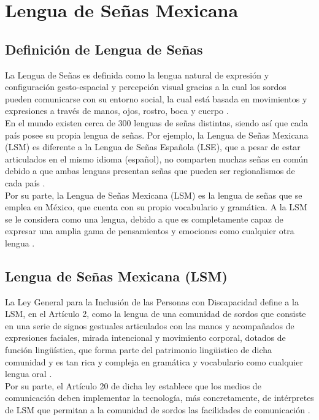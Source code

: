 \newpage
\section{Lengua de Señas Mexicana}
\subsection{Definición de Lengua de Señas}
La Lengua de Señas es definida como la lengua natural de expresión y configuración gesto-espacial y percepción visual gracias a la cual los sordos pueden comunicarse con su entorno social, la cual está basada en movimientos y expresiones a través de manos, ojos, rostro, boca y cuerpo \cite{ref33}.\\

En el mundo existen cerca de 300 lenguas de señas distintas, siendo así que cada país posee su propia lengua de señas. Por ejemplo, la Lengua de Señas Mexicana (LSM) es diferente a la Lengua de Señas Española (LSE), que a pesar de estar articulados en el mismo idioma (español), no comparten muchas señas en común debido a que ambas lenguas presentan señas que pueden ser regionalismos de cada país \cite{ref33}.\\

Por su parte, la Lengua de Señas Mexicana (LSM) es la lengua de señas que se emplea en México, que cuenta con su propio vocabulario y gramática. A la LSM se le considera como una lengua, debido a que es completamente capaz de expresar una amplia gama de pensamientos y emociones como cualquier otra lengua \cite{ref33}.

\subsection{Lengua de Señas Mexicana (LSM)}
La Ley General para la Inclusión de las Personas con Discapacidad \cite{ref34} define a la LSM, en el Artículo 2, como la lengua de una comunidad de sordos que consiste en una serie de signos gestuales articulados con las manos y acompañados de expresiones faciales, mirada intencional y movimiento corporal, dotados de función lingüística, que forma parte del patrimonio lingüistico de dicha comunidad y es tan rica y compleja en gramática y vocabulario como cualquier lengua oral \cite{ref34}.\\

Por su parte, el Artículo 20 de dicha ley establece que los medios de comunicación deben implementar la tecnología, más concretamente, de intérpretes de LSM que permitan a la comunidad de sordos las facilidades de comunicación \cite{ref34}.\\


